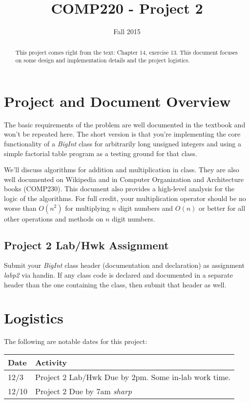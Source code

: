 \documentclass[10pt]{article}
\title{COMP220 - Project 2}
\author{ }
\date{Fall 2015}
\begin{document}
\maketitle
\thispagestyle{empty}

\begin{abstract}
This project comes right from the text: Chapter 14, exercise 13. This document focuses on some design and implementation details and the project logistics. 
\end{abstract}

\section{Project and Document Overview}

The basic requirements of the problem are well documented in the textbook and won't be repeated here. The short version is that you're implementing the core functionality of a \textit{BigInt} class for arbitrarily long unsigned integers and using a simple factorial table program as a testing ground for that class. 

We'll discuss algorithms for addition and multiplication in class. They are also well documented on Wikipedia and in Computer Organization and Architecture books (COMP230). This document also provides a high-level analysis for the logic of the algorithms. For full credit, your multiplication operator should be no worse than $O(n^2)$ for multiplying $n$ digit numbers and $O(n)$ or better for all other operations and methods on $n$ digit numbers.   

\subsection{Project 2 Lab/Hwk Assignment}

Submit your \textit{BigInt} class header (documentation and declaration) as assignment \textit{labp2} via handin. If any class code is declared and documented in a separate header than the one containing the class, then submit that header as well.  

\section{Logistics}

The following are notable dates for this project:
\begin{center}
\begin{tabular}{ll}
Date & Activity \\ \hline
12/3 & Project 2 Lab/Hwk Due by 2pm. Some in-lab work time. \\
12/10 & Project 2 Due by 7am \textit{sharp}
\end{tabular}
\end{center}
\end{document}
